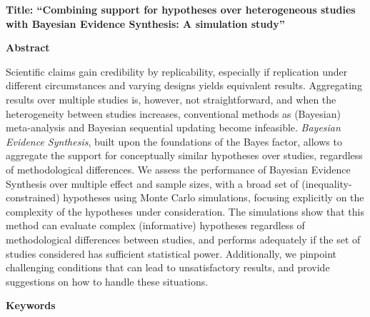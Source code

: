 \documentclass[
]{interact}
\begin{document}
\ifdefined\Shaded\renewenvironment{Shaded}{\begin{tcolorbox}[borderline west={3pt}{0pt}{shadecolor}, breakable, sharp corners, boxrule=0pt, enhanced, interior hidden, frame hidden]}{\end{tcolorbox}}\fi

\doublespacing
{}
% 
% 
% 
% 
% 

\textbf{Title: ``Combining support for hypotheses over heterogeneous
studies with Bayesian Evidence Synthesis: A simulation study''}

\textbf{Abstract}

Scientific claims gain credibility by replicability, especially if
replication under different circumstances and varying designs yields
equivalent results. Aggregating results over multiple studies is,
however, not straightforward, and when the heterogeneity between studies
increases, conventional methods as (Bayesian) meta-analysis and Bayesian
sequential updating become infeasible. \emph{Bayesian Evidence
Synthesis}, built upon the foundations of the Bayes factor, allows to
aggregate the support for conceptually similar hypotheses over studies,
regardless of methodological differences. We assess the performance of
Bayesian Evidence Synthesis over multiple effect and sample sizes, with
a broad set of (inequality-constrained) hypotheses using Monte Carlo
simulations, focusing explicitly on the complexity of the hypotheses
under consideration. The simulations show that this method can evaluate
complex (informative) hypotheses regardless of methodological
differences between studies, and performs adequately if the set of
studies considered has sufficient statistical power. Additionally, we
pinpoint challenging conditions that can lead to unsatisfactory results,
and provide suggestions on how to handle these situations.

\textbf{Keywords}
\end{document}
